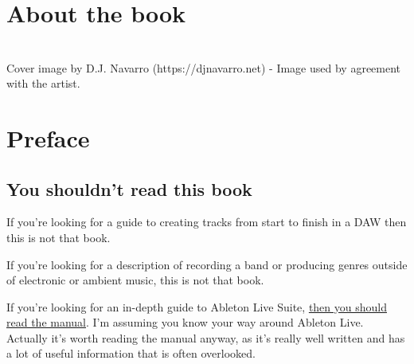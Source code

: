 \documentclass[
  12pt,
  letterpaper,
  oneside,
  open=any]{scrbook}
\renewcommand*\contentsname{Table of contents}
\newcommand\contentsname{Table of contents}
\begin{document}

\renewcommand*\contentsname{Chapters}
{
\hypersetup{linkcolor=}
\setcounter{tocdepth}{1}
\tableofcontents
}
\mainmatter
{}

\chapter*{About the book}\label{index}



\chapter*{}\label{index}

\markboth{}{}

Cover image by D.J. Navarro (https://djnavarro.net) - Image used by
agreement with the artist.


\chapter*{Preface}\label{000-Preface}


\section*{You shouldn't read this
book}\label{you-shouldnt-read-this-book}


If you're looking for a guide to creating tracks from start to finish in
a DAW then this is not that book.

If you're looking for a description of recording a band or producing
genres outside of electronic or ambient music, this is not that book.

If you're looking for an in-depth guide to Ableton Live Suite,
\href{https://www.ableton.com/en/manual/welcome-to-live/}{then you
should read the manual}. I'm assuming you know your way around Ableton
Live. Actually it's worth reading the manual anyway, as it's really well
written and has a lot of useful information that is often overlooked.
\end{document}
